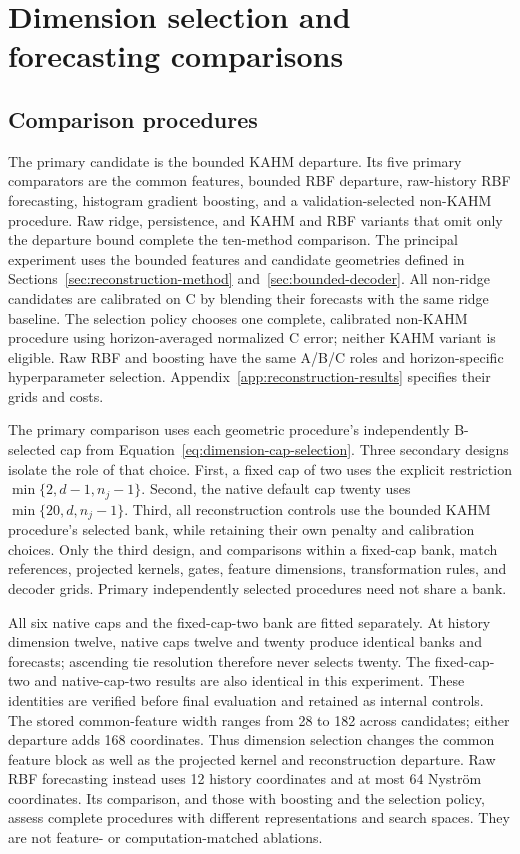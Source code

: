 \section{Dimension selection and forecasting comparisons}\label{sec:experiment}

\subsection{Comparison procedures}


The primary candidate is the bounded KAHM departure. Its five primary
comparators are the common features, bounded RBF departure, raw-history
RBF forecasting, histogram gradient boosting, and a validation-selected
non-KAHM procedure. Raw ridge, persistence, and KAHM and RBF variants that
omit only the departure bound complete the ten-method comparison.
The principal experiment uses the bounded features and candidate geometries
defined in Sections~\ref{sec:reconstruction-method}
and~\ref{sec:bounded-decoder}. All non-ridge candidates are calibrated on C by blending their forecasts
with the same ridge baseline. The selection policy chooses one complete,
calibrated non-KAHM procedure using horizon-averaged normalized C error;
neither KAHM variant is eligible. Raw RBF and boosting have the same
A/B/C roles and horizon-specific hyperparameter selection.
Appendix~\ref{app:reconstruction-results} specifies their grids and costs.

The primary comparison uses each geometric procedure's independently
B-selected cap from Equation~\eqref{eq:dimension-cap-selection}.
Three secondary designs isolate the role of that choice. First, a fixed
cap of two uses the explicit restriction
$\min\{2,d-1,n_j-1\}$. Second, the native default cap twenty uses
$\min\{20,d,n_j-1\}$. Third, all reconstruction controls use the
bounded KAHM procedure's selected bank, while retaining their own
penalty and calibration choices. Only the third design, and comparisons
within a fixed-cap bank, match references, projected kernels, gates,
feature dimensions, transformation rules, and decoder grids. Primary
independently selected procedures need not share a bank.

All six native caps and the fixed-cap-two bank are fitted separately.
At history dimension twelve, native caps twelve and twenty produce
identical banks and forecasts; ascending tie resolution therefore never
selects twenty. The fixed-cap-two and native-cap-two results are also
identical in this experiment. These identities are verified before final
evaluation and retained as internal controls. The stored common-feature
width ranges from 28 to 182 across candidates; either departure adds 168
coordinates. Thus dimension selection changes the common feature block
as well as the projected kernel and reconstruction departure.
Raw RBF forecasting instead uses 12 history coordinates and at most
64 Nystr\"om coordinates. Its comparison, and those with boosting and
the selection policy, assess complete procedures with different
representations and search spaces. They are not feature- or
computation-matched ablations.

